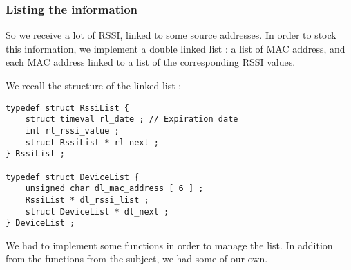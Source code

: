 \subsubsection{Listing the information}

So we receive a lot of RSSI, linked to some source addresses. In order to stock
this information, we implement a double linked list : a list of MAC address,
and each MAC address linked to a list of the corresponding RSSI values.

We recall the structure of the linked list : 

\begin{lstlisting} 
typedef struct RssiList {
	struct timeval rl_date ; // Expiration date
	int rl_rssi_value ;
	struct RssiList * rl_next ;
} RssiList ;

typedef struct DeviceList {
	unsigned char dl_mac_address [ 6 ] ;
	RssiList * dl_rssi_list ;
	struct DeviceList * dl_next ;
} DeviceList ;
\end{lstlisting}

We had to implement some functions in order to manage the list. In addition
from the functions from the subject, we had some of our own.

